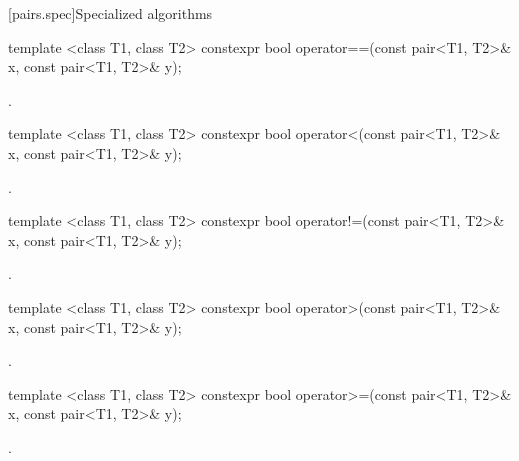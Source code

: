 [pairs.spec]{Specialized algorithms}

%
\begin{itemdecl}
template <class T1, class T2>
  constexpr bool operator==(const pair<T1, T2>& x, const pair<T1, T2>& y);
\end{itemdecl}

\begin{itemdescr}
\pnum
\returns
{}.
\end{itemdescr}

%
\begin{itemdecl}
template <class T1, class T2>
  constexpr bool operator<(const pair<T1, T2>& x, const pair<T1, T2>& y);
\end{itemdecl}

\begin{itemdescr}
\pnum
\returns
{}.
\end{itemdescr}

%
\begin{itemdecl}
template <class T1, class T2>
  constexpr bool operator!=(const pair<T1, T2>& x, const pair<T1, T2>& y);
\end{itemdecl}

\begin{itemdescr}
\pnum
\returns {}.
\end{itemdescr}

%
\begin{itemdecl}
template <class T1, class T2>
  constexpr bool operator>(const pair<T1, T2>& x, const pair<T1, T2>& y);
\end{itemdecl}

\begin{itemdescr}
\pnum
\returns {}.
\end{itemdescr}

%
\begin{itemdecl}
template <class T1, class T2>
  constexpr bool operator>=(const pair<T1, T2>& x, const pair<T1, T2>& y);
\end{itemdecl}

\begin{itemdescr}
\pnum
\returns {}.
\end{itemdescr}

